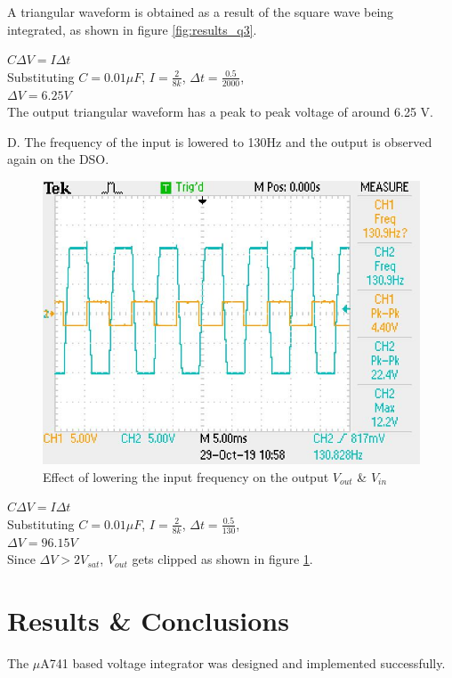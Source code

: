 \documentclass[12pt, titlepage]{article}
\theoremstyle{definition}
\begin{document}
    A triangular waveform is obtained as a result of the square wave being integrated, as shown in figure \ref{fig:results_q3}.

    $C\Delta V=I\Delta t$\\
    Substituting $C=0.01\mu F$, $I=\frac{2}{8k}$, $\Delta t=\frac{0.5}{2000}$, \\
    $\Delta V = 6.25 V$\\
    The output triangular waveform has a peak to peak voltage of around 6.25 V.

    D. The frequency of the input is lowered to 130Hz and the output is observed again on the DSO.

    \begin{figure}
      \includegraphics[scale=0.25]{images/results_q4_2.jpeg}
      \caption{Effect of lowering the input frequency on the output \color{cyan}$V_{out}$ \color{black}\& \color{orange}$V_{in}$}
      \label{fig:results_q4}
    \end{figure}

    $C\Delta V=I\Delta t$\\
    Substituting $C=0.01\mu F$, $I=\frac{2}{8k}$, $\Delta t=\frac{0.5}{130}$, \\
    $\Delta V = 96.15 V$ \\
    Since $\Delta V > 2V_{sat}$, $V_{out}$ gets clipped as shown in figure \ref{fig:results_q4}.


  \newpage
  \section{Results \& Conclusions}
    The $\mu$A741 based voltage integrator was designed and implemented successfully.
\end{document}
